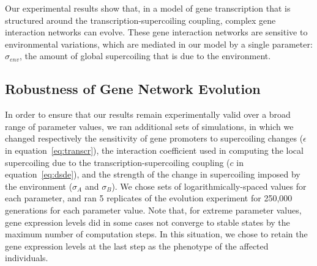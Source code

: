 Our experimental results show that, in a model of gene transcription that is structured around the transcription-supercoiling coupling, complex gene interaction networks can evolve.
These gene interaction networks are sensitive to environmental variations, which are mediated in our model by a single parameter: $\sigma_{env}$, the amount of global supercoiling that is due to the environment.

\subsection{Robustness of Gene Network Evolution}
\label{sec:alife:param_explor}

In order to ensure that our results remain experimentally valid over a broad range of parameter values, we ran additional sets of simulations, in which we changed respectively the sensitivity of gene promoters to supercoiling changes ($\epsilon$ in equation~\ref{eq:transcr}), the interaction coefficient used in computing the local supercoiling due to the transcription-supercoiling coupling ($c$ in equation~\ref{eq:dsde}), and the strength of the change in supercoiling imposed by the environment ($\sigma_A$ and $\sigma_B$).
We chose sets of logarithmically-spaced values for each parameter, and ran 5 replicates of the evolution experiment for 250,000 generations for each parameter value.
Note that, for extreme parameter values, gene expression levels did in some cases not converge to stable states by the maximum number of computation steps.
In this situation, we chose to retain the gene expression levels at the last step as the phenotype of the affected individuals.

